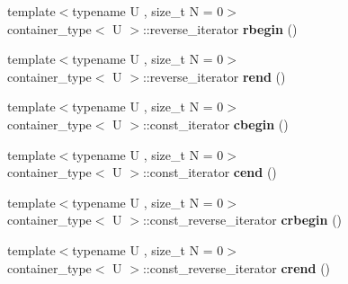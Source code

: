 \begin{DoxyCompactItemize}
\item 
\hypertarget{classheterogeneous_1_1heterodeque_3_01_t_00_01_types_8_8_8_4_ab1f3885d73a259420cefbd7477e027e1}{}{\footnotesize template$<$typename U , size\+\_\+t N = 0$>$ }\\container\+\_\+type$<$ U $>$\+::reverse\+\_\+iterator {\bfseries rbegin} ()\label{classheterogeneous_1_1heterodeque_3_01_t_00_01_types_8_8_8_4_ab1f3885d73a259420cefbd7477e027e1}

\item 
\hypertarget{classheterogeneous_1_1heterodeque_3_01_t_00_01_types_8_8_8_4_a5d2353582249213a43028e5df971cedd}{}{\footnotesize template$<$typename U , size\+\_\+t N = 0$>$ }\\container\+\_\+type$<$ U $>$\+::reverse\+\_\+iterator {\bfseries rend} ()\label{classheterogeneous_1_1heterodeque_3_01_t_00_01_types_8_8_8_4_a5d2353582249213a43028e5df971cedd}

\item 
\hypertarget{classheterogeneous_1_1heterodeque_3_01_t_00_01_types_8_8_8_4_a7378570cff60beb97ddbe2489bbf3d03}{}{\footnotesize template$<$typename U , size\+\_\+t N = 0$>$ }\\container\+\_\+type$<$ U $>$\+::const\+\_\+iterator {\bfseries cbegin} ()\label{classheterogeneous_1_1heterodeque_3_01_t_00_01_types_8_8_8_4_a7378570cff60beb97ddbe2489bbf3d03}

\item 
\hypertarget{classheterogeneous_1_1heterodeque_3_01_t_00_01_types_8_8_8_4_a9ff4a54d5ac69082474fb78656be57db}{}{\footnotesize template$<$typename U , size\+\_\+t N = 0$>$ }\\container\+\_\+type$<$ U $>$\+::const\+\_\+iterator {\bfseries cend} ()\label{classheterogeneous_1_1heterodeque_3_01_t_00_01_types_8_8_8_4_a9ff4a54d5ac69082474fb78656be57db}

\item 
\hypertarget{classheterogeneous_1_1heterodeque_3_01_t_00_01_types_8_8_8_4_aa755c98996e4c7f7b22bb97c2159b095}{}{\footnotesize template$<$typename U , size\+\_\+t N = 0$>$ }\\container\+\_\+type$<$ U $>$\+::const\+\_\+reverse\+\_\+iterator {\bfseries crbegin} ()\label{classheterogeneous_1_1heterodeque_3_01_t_00_01_types_8_8_8_4_aa755c98996e4c7f7b22bb97c2159b095}

\item 
\hypertarget{classheterogeneous_1_1heterodeque_3_01_t_00_01_types_8_8_8_4_a1c4159a8e94c5fb239c80d780acbe724}{}{\footnotesize template$<$typename U , size\+\_\+t N = 0$>$ }\\container\+\_\+type$<$ U $>$\+::const\+\_\+reverse\+\_\+iterator {\bfseries crend} ()\label{classheterogeneous_1_1heterodeque_3_01_t_00_01_types_8_8_8_4_a1c4159a8e94c5fb239c80d780acbe724}


\end{DoxyCompactItemize}
